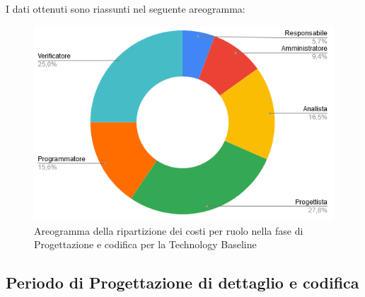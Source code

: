 I dati ottenuti sono riassunti nel seguente areogramma:
\begin{figure}[H]
\centering
\includegraphics[scale=0.60]{img/grafici/torta_fase_prog_architetturale.png}
\caption{Areogramma della ripartizione dei costi per ruolo nella fase di Progettazione e codifica per la Technology Baseline}
\end{figure}
 
 
\subsection{Periodo di Progettazione di dettaglio e codifica}
